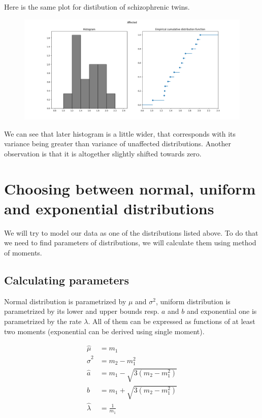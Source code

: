 \documentclass[12pt,a4paper]{article} %
\begin{document}
Here is the same plot for distibution of schizophrenic twins.
\begin{figure}[h]
  \centering
  \includegraphics[scale=0.4]{./img/affected_hist_ecdf.png}
  \label{fig:aff_ecdf}
\end{figure}

We can see that later histogram is a little wider, that corresponds with its variance being greater than variance of unaffected distributions. Another observation is that it is altogether slightly shifted towards zero.

\section{Choosing between normal, uniform and exponential distributions}
We will try to model our data as one of the distributions listed above. To do that we need to find parameters of distributions, we will calculate them using method of moments. %

\subsection{Calculating parameters}

Normal distribution is parametrized by $\mu$ and $\sigma^2$, uniform distribution is parametrized by its lower and upper bounds resp. $a$ and $b$ and exponential one is parametrized by the rate $\lambda$. All of them can be expressed as functions of at least two moments (exponential can be derived using single moment).

\begin{align*}
  \hat \mu &= m_1 \\
  \hat \sigma^2 &= m_2 - m_1^2 \\
  \hat a &= m_1 - \sqrt{3(m_2 - m_1^2)}\\ 
  \hat b &= m_1 + \sqrt{3(m_2 - m_1^2)}\\ 
  \hat \lambda &= \frac{1}{m_1}
\end{align*}
\end{document}
